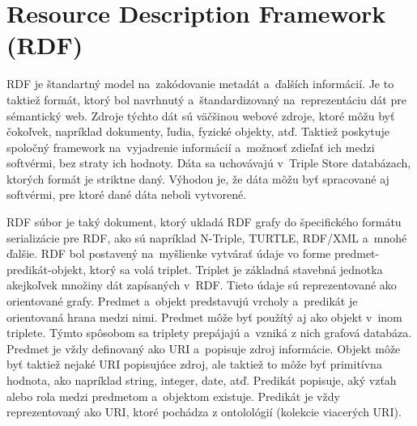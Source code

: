 \documentclass[12pt, a4paper, oneside]{book}
\begin{document}


\section{Resource Description Framework (RDF)}

RDF \cite{rdf} je štandartný model na~zakódovanie metadát a~ďalších informácií. Je to taktiež formát, ktorý bol navrhnutý a~štandardizovaný na~reprezentáciu dát pre sémantický web. Zdroje týchto dát sú väčšinou webové zdroje, ktoré môžu byť čokoľvek, napríklad dokumenty, ľudia, fyzické objekty, atď. Taktiež poskytuje spoločný framework na~vyjadrenie informácií a~možnosť zdieľať ich medzi softvérmi, bez straty ich hodnoty. Dáta sa uchovávajú v~Triple Store databázach, ktorých formát je striktne daný. Výhodou je, že dáta môžu byť spracované aj softvérmi, pre ktoré dané dáta neboli vytvorené.




RDF súbor je taký dokument, ktorý ukladá RDF grafy do špecifického formátu serializácie pre RDF, ako sú napríklad N-Triple, TURTLE, RDF/XML a~mnohé ďalšie. RDF bol postavený na~myšlienke vytvárať údaje vo forme predmet-predikát-objekt, ktorý sa volá triplet. Triplet je základná stavebná jednotka akejkoľvek množiny dát zapísaných v~RDF. Tieto údaje sú reprezentované ako orientované grafy. Predmet a~objekt predstavujú vrcholy a~predikát je orientovaná hrana medzi nimi. Predmet môže byť použítý aj ako objekt v~inom triplete. Týmto spôsobom sa triplety prepájajú a~vzniká z nich grafová databáza. Predmet je vždy definovaný ako URI a~popisuje zdroj informácie. Objekt môže byť taktiež nejaké URI popisujúce zdroj, ale taktiež to môže byť primitívna hodnota, ako napríklad string, integer, date, atď. Predikát popisuje, aký vzťah alebo rola medzi predmetom a~objektom existuje. Predikát je vždy reprezentovaný ako URI, ktoré pochádza z ontolológií (kolekcie viacerých URI).
\end{document}
